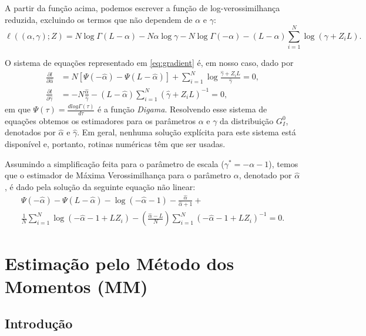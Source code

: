 A partir da função acima, podemos escrever a função de log-verossimilhança reduzida, excluindo os termos que não dependem de $\alpha$ e $\gamma$:
\begin{equation}
    \ell ((\alpha, \gamma); Z) = N\log\Gamma(L-\alpha) - N\alpha \log\gamma - N\log\Gamma(-\alpha) - (L-\alpha)\sum_{i=1}^{N}\log(\gamma +Z_iL). \label{eq:logVerRed}
\end{equation}

O sistema de equações representado em \eqref{eq:gradient} é, em nosso caso, dado por
\begin{align}
  \frac{\partial l}{\partial \widehat{\alpha}} &= N[\Psi(-\widehat{\alpha}) - \Psi(L-\widehat{\alpha})] + \sum_{i=1}^{N}\log\frac{\widehat{\gamma} + Z_iL}{\widehat{\gamma}} = 0,\\
   \frac{\partial l}{\partial \widehat{\gamma}} &= -N\frac{\widehat{\alpha}}{\widehat{\gamma}} - (L - \widehat{\alpha})\sum_{i=1}^{N}(\widehat{\gamma} + Z_iL)^{-1} = 0,
\end{align}
em que $\Psi(\tau) = \frac{\textit{d}log\Gamma(\tau)}{\textit{d}\tau}$ é a função \textit{Digama}. Resolvendo esse sistema de equações obtemos os estimadores para os parâmetros $\alpha$ e $\gamma$ da distribuição $G_I^0$, denotados por $\widehat{\alpha}$ e $\widehat{\gamma}$. Em geral, nenhuma solução explícita para este sistema está disponível e, portanto, rotinas numéricas têm que ser usadas.

Assumindo a simplificação feita para o parâmetro de escala ($\gamma^{*} = -\alpha - 1$), temos que o estimador de Máxima Verossimilhança para o parâmetro $\alpha$, denotado por $\widehat{\alpha}$, é dado pela solução da seguinte equação não linear:
\begin{align}
    \Psi(-\widehat{\alpha}) - \Psi(L-\widehat{\alpha}) - \log(-\widehat{\alpha}-1) - \frac{\widehat{\alpha}}{\widehat{\alpha}+1} + \nonumber \\ 
    \frac{1}{N}\sum_{i=1}^{N}\log(-\widehat{\alpha} - 1 + LZ_i) - \left ( \frac{\widehat{\alpha}-L}{N} \right )\sum_{i=1}^{N}(-\widehat{\alpha} - 1 + LZ_i)^{-1} = 0.
\end{align}

\section{Estimação pelo Método dos Momentos (MM)}

\subsection{Introdução}

